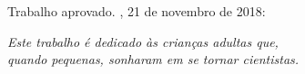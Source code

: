 \documentclass[
12pt,        %
openright,   %
twoside,     %
a4paper,     %
english,       %
brazil,        %
%
%
]{ppgca}
\begin{document}
%
% 
%
\begin{folhadeaprovacao}

  \begin{center}
    {\theauthor}

    \vspace*{\fill}\vspace*{\fill}
    \thetitle
    \vspace*{\fill}
    
    \hspace{.45\textwidth}
    \begin{minipage}{.5\textwidth}
        \imprimirpreambulo
    \end{minipage}%
    \vspace*{\fill}
   \end{center}
   
   Trabalho aprovado. \imprimirlocal, 21 de novembro de 2018:

      
   \begin{center}
    \vspace*{0.5cm}
    {\large\imprimirlocal}
    \par
    {\large\imprimirdata}
    \vspace*{1cm}
  \end{center}
  
\end{folhadeaprovacao}

\begin{dedicatoria}
   \vspace*{\fill}
   \centering
   \noindent
   \textit{Este trabalho é dedicado às crianças adultas que,\\
   quando pequenas, sonharam em se tornar cientistas.} \vspace*{\fill}
\end{dedicatoria}
\end{document}
